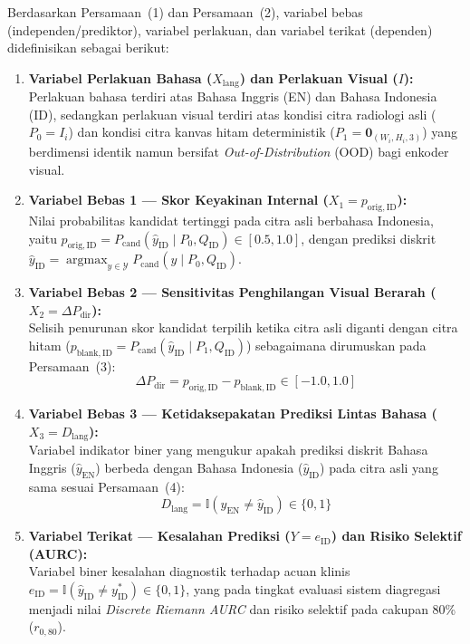 \documentclass[a4paper,10pt,twoside]{article}
\begin{document}
Berdasarkan Persamaan~(1) dan Persamaan~(2), variabel bebas (independen/prediktor), variabel perlakuan, dan variabel terikat (dependen) didefinisikan sebagai berikut:
\begin{enumerate}[leftmargin=*]
    \item \textbf{Variabel Perlakuan Bahasa ($X_{\mathrm{lang}}$) dan Perlakuan Visual ($I$):} \\
    Perlakuan bahasa terdiri atas Bahasa Inggris (EN) dan Bahasa Indonesia (ID), sedangkan perlakuan visual terdiri atas kondisi citra radiologi asli ($P_0 = I_i$) dan kondisi citra kanvas hitam deterministik ($P_1 = \mathbf{0}_{(W_i, H_i, 3)}$) yang berdimensi identik namun bersifat \textit{Out-of-Distribution} (OOD) bagi enkoder visual.
    
    \item \textbf{Variabel Bebas 1 --- Skor Keyakinan Internal ($X_1 = p_{\mathrm{orig,ID}}$):} \\
    Nilai probabilitas kandidat tertinggi pada citra asli berbahasa Indonesia, yaitu $p_{\mathrm{orig,ID}} = P_{\mathrm{cand}}(\hat{y}_{\mathrm{ID}} \mid P_0, Q_{\mathrm{ID}}) \in [0.5, 1.0]$, dengan prediksi diskrit $\hat{y}_{\mathrm{ID}} = \operatorname{argmax}_{y \in \mathcal{Y}} P_{\mathrm{cand}}(y \mid P_0, Q_{\mathrm{ID}})$.
    
    \item \textbf{Variabel Bebas 2 --- Sensitivitas Penghilangan Visual Berarah ($X_2 = \Delta P_{\mathrm{dir}}$):} \\
    Selisih penurunan skor kandidat terpilih ketika citra asli diganti dengan citra hitam ($p_{\mathrm{blank,ID}} = P_{\mathrm{cand}}(\hat{y}_{\mathrm{ID}} \mid P_1, Q_{\mathrm{ID}})$) sebagaimana dirumuskan pada Persamaan~(3):
    \begin{equation}
    \Delta P_{\mathrm{dir}} = p_{\mathrm{orig,ID}} - p_{\mathrm{blank,ID}} \in [-1.0, 1.0]
    \end{equation}
    
    \item \textbf{Variabel Bebas 3 --- Ketidaksepakatan Prediksi Lintas Bahasa ($X_3 = D_{\mathrm{lang}}$):} \\
    Variabel indikator biner yang mengukur apakah prediksi diskrit Bahasa Inggris ($\hat{y}_{\mathrm{EN}}$) berbeda dengan Bahasa Indonesia ($\hat{y}_{\mathrm{ID}}$) pada citra asli yang sama sesuai Persamaan~(4):
    \begin{equation}
    D_{\mathrm{lang}} = \mathbb{I}(\hat{y}_{\mathrm{EN}} \ne \hat{y}_{\mathrm{ID}}) \in \{0, 1\}
    \end{equation}
    
    \item \textbf{Variabel Terikat --- Kesalahan Prediksi ($Y = e_{\mathrm{ID}}$) dan Risiko Selektif (AURC):} \\
    Variabel biner kesalahan diagnostik terhadap acuan klinis $e_{\mathrm{ID}} = \mathbb{I}(\hat{y}_{\mathrm{ID}} \ne y_{\mathrm{ID}}^*) \in \{0, 1\}$, yang pada tingkat evaluasi sistem diagregasi menjadi nilai \textit{Discrete Riemann AURC} dan risiko selektif pada cakupan 80\% ($r_{0{,}80}$).
\end{enumerate}
\end{document}
